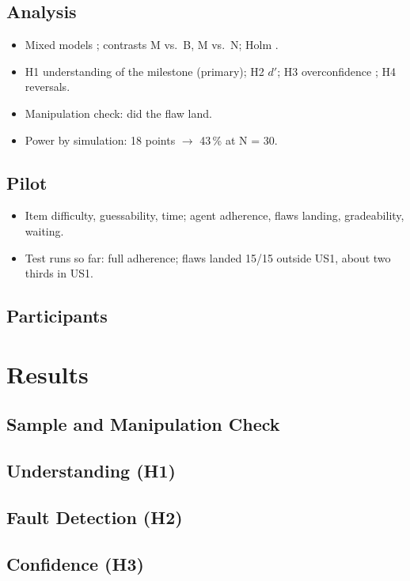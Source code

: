 \section{Analysis}
\begin{itemize}
  \item Mixed models \citep{bates_fitting_2015}; contrasts M vs.\ B, M vs.\ N; Holm \citep{holm_simple_1979}.
  \item H1 understanding of the milestone (primary); H2 \(d'\); H3 overconfidence \citep{kuznetsova_lmertest_2017}; H4 reversals.
  \item Manipulation check: did the flaw land.
  \item Power by simulation: 18 points \(\to\) 43\,\% at N = 30.
\end{itemize}

\section{Pilot}
\begin{itemize}
  \item Item difficulty, guessability, time; agent adherence, flaws landing, gradeability, waiting.
  \item Test runs so far: full adherence; flaws landed 15/15 outside US1, about two thirds in US1.
\end{itemize}

\section{Participants}


\chapter{Results}
\label{chap:results}

\section{Sample and Manipulation Check}
\section{Understanding (H1)}
\section{Fault Detection (H2)}
\section{Confidence (H3)}
